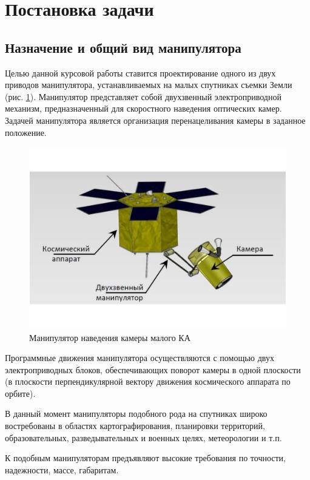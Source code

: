 \newpage
\section{Постановка задачи}
\subsection{Назначение и общий вид манипулятора}
Целью данной курсовой работы ставится проектирование одного из двух
приводов манипулятора, устанавливаемых на малых спутниках съемки Земли (рис. \ref{sattelite_general_view}).
Манипулятор представляет собой двухзвенный электроприводной механизм,
предназначенный для скоростного наведения оптических камер.
Задачей манипулятора является организация перенацеливания камеры в заданное положение.

\begin{figure}[h!]
    \centering
    \includegraphics[width=\textwidth, keepaspectratio]{./src/pictures/sattelite_3d_images/general_view}
    \caption{Манипулятор наведения камеры малого КА}
    \label{sattelite_general_view}
\end{figure}

Программные движения манипулятора осуществляются с помощью двух электроприводных блоков,
обеспечивающих поворот камеры в одной плоскости (в плоскости перпендикулярной
вектору движения космического аппарата по орбите).

В данный момент манипуляторы подобного рода на спутниках широко востребованы
в областях картографирования, планировки территорий, образовательных,
разведывательных и военных целях, метеорологии и т.п.

К подобным манипуляторам предъявляют высокие требования по точности,
надежности, массе, габаритам.

